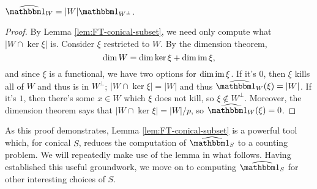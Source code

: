 \begin{thm}\label{thm:FT-subspace}
    $\widehat{\IND_W} = |W| \IND_{W^\perp}$.
    \begin{proof}
        By Lemma \ref{lem:FT-conical-subset}, we need only compute what 
        $|W\cap\ker\xi|$ is. Consider $\xi$ restricted to $W$. By the dimension theorem,
        \[ \dim W = \dim \ker \xi + \dim \operatorname{im} \xi, \]
        and since $\xi$ is a functional, we have two options for $\dim\operatorname{im}\xi$.
        If it's $0$, then $\xi$ kills all of $W$ and thus is in $W^\perp$; 
        $|W\cap\ker\xi| = |W|$ and thus $\widehat{\IND_W}(\xi) = |W|$. If it's $1$,
        then there's some $x\in W$ which $\xi$ does not kill, so $\xi\not\in W^\perp$.
        Moreover, the dimension theorem says that $|W\cap\ker\xi| = |W|/p$, so 
        $\widehat{\IND_W}(\xi) = 0$.
    \end{proof}
\end{thm}
As this proof demonstrates, Lemma \ref{lem:FT-conical-subset} is a powerful tool which, for conical $S$, reduces the computation of $\widehat{\IND_S}$ to a counting problem. We will repeatedly make use of the lemma in what follows. Having established this useful groundwork, we move on to computing $\widehat{\IND_S}$ for other interesting choices of $S$.